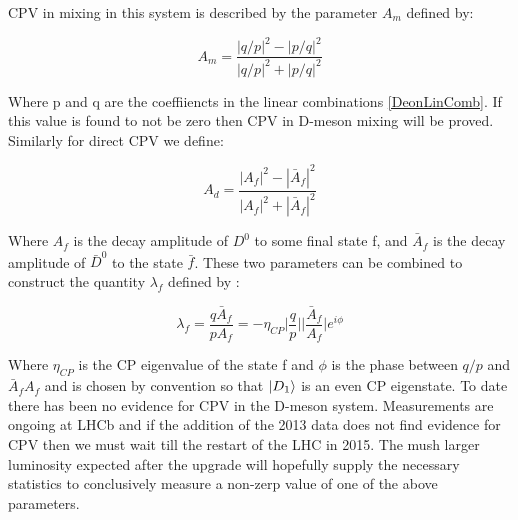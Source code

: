 CPV in mixing in this system is described by the parameter $A_{m}$ defined by:

\begin{equation*}
A_{m} = \frac{|q/p|^{2} - |p/q|^{2}}{|q/p|^{2} + |p/q|^{2}}
\end{equation*}

\noindent Where p and q are the coeffiiencts in the linear combinations \ref{DeonLinComb}. If this value is found to not be zero then CPV in D-meson mixing will be proved. Similarly for direct CPV we define:

\begin{equation*}
A_{d} = \frac{|A_{f}|^{2} - |\bar{A}_{f}|^{2}}{|A_{f}|^{2} + |\bar{A}_{f}|^{2}}
\end{equation*}

\noindent Where $A_{f}$ is the decay amplitude of $D^{0}$ to some final state f, and $\bar{A}_{f}$ is the decay amplitude of $\bar{D}^{0}$ to the state $\bar{f}$. These two parameters can be combined to construct the quantity $\lambda_{f}$ defined by \cite{LHCbAsymmetry}:

\begin{equation*}
\lambda_{f} = \frac{q \bar{A}_{f}}{p A_{f}} = - \eta_{CP} \bigg|\frac{q}{p}\bigg| \bigg|\frac{\bar{A}_{f}}{A_{f}}\bigg| e^{i \phi}
\end{equation*}

\noindent Where $\eta_{CP}$ is the CP eigenvalue of the state f and $\phi$ is the phase between $q/p$ and ${\bar{A}_{f}}{A_{f}}$ and is chosen by convention so that $\ket{D_{1}}$ is an even CP eigenstate. To date there has been no evidence for CPV in the D-meson system. Measurements are ongoing at LHCb and if the addition of the 2013 data does not find evidence for CPV then we must wait till the restart of the LHC in 2015. The mush larger luminosity expected after the upgrade will hopefully supply the necessary statistics to conclusively measure a non-zerp value of one of the above parameters. 





